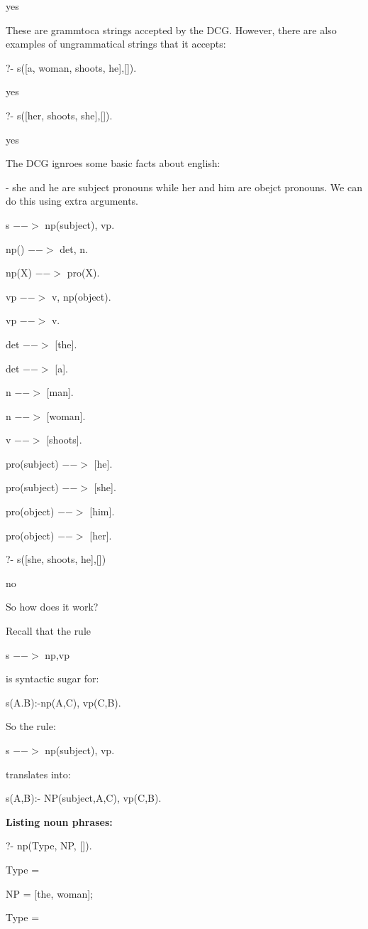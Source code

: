 \documentclass{article}
\begin{document}
yes

These are grammtoca strings accepted by the DCG. However, there are also examples of ungrammatical strings that it accepts:

?- s([a, woman, shoots, he],[]).

yes


?- s([her, shoots, she],[]).

yes


The DCG ignroes some basic facts about english:

- she and he are subject pronouns while her and him are obejct pronouns. We can do this using extra arguments.

s $-->$ np(subject), vp. 

np(\textunderscore) $-->$ det, n. 

np(X) $-->$ pro(X).

vp $-->$ v, np(object). 

vp $-->$ v. 

det $-->$ [the].     
       
det $-->$ [a]. 

n $-->$ [man].    
           
n $-->$ [woman].   
        
v $-->$ [shoots].

pro(subject) $-->$ [he].

pro(subject) $-->$  [she].

pro(object) $-->$ [him].

pro(object) $-->$ [her].


?- s([she, shoots, he],[])

no




So how does it work?

Recall that the rule 

s $-->$ np,vp

is syntactic sugar for:

s(A.B):-np(A,C), vp(C,B).


So the rule:
 
s $-->$ np(subject), vp.

translates into:

s(A,B):- NP(subject,A,C), vp(C,B).


\textbf{Listing noun phrases:}

?- np(Type, NP, []).

Type =\textunderscore

NP = [the, woman];

Type =\textunderscore
\end{document}

